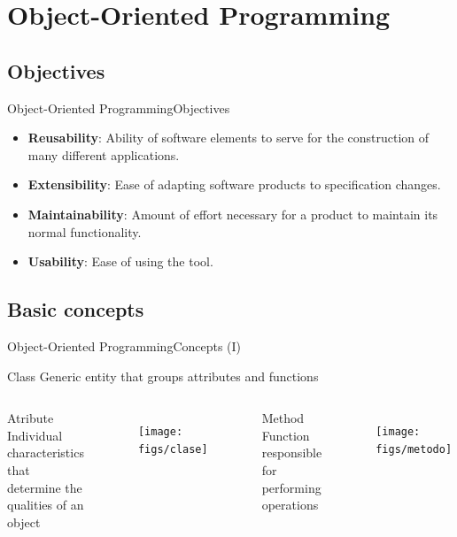 \documentclass[10pt,compress]{beamer} %
\begin{document}
\section[Object-Oriented Programming]{Object-Oriented Programming}

\subsection{Objectives}

\begin{frame}{Object-Oriented Programming}{Objectives}
\begin{itemize}
  	\item \textbf{Reusability}: Ability of software elements to serve for the construction of many different applications.
  	\item \textbf{Extensibility}: Ease of adapting software products to specification changes.
  	\item \textbf{Maintainability}: Amount of effort necessary for a product to maintain its normal functionality.   
  	\item \textbf{Usability}: Ease of using the tool.
  	\end{itemize} 	
\end{frame}

\subsection{Basic concepts}

\begin{frame}{Object-Oriented Programming}{Concepts (I)}
	\begin{block}{Class}
		 Generic entity that groups attributes and functions
  	\end{block}	


    \begin{columns}[t]

	    \begin{block}{Atribute}
		Individual characteristics that determine the qualities of an object
  	    \end{block}	

		\begin{figure}
			\texttt{[image: figs/clase]}	
		\end{figure}				


	    \begin{block}{Method}
		 Function responsible for performing operations
  	    \end{block}	
		\begin{figure}
			\texttt{[image: figs/metodo]}
		\end{figure}				
   \end{columns}
\end{frame}
\end{document}
